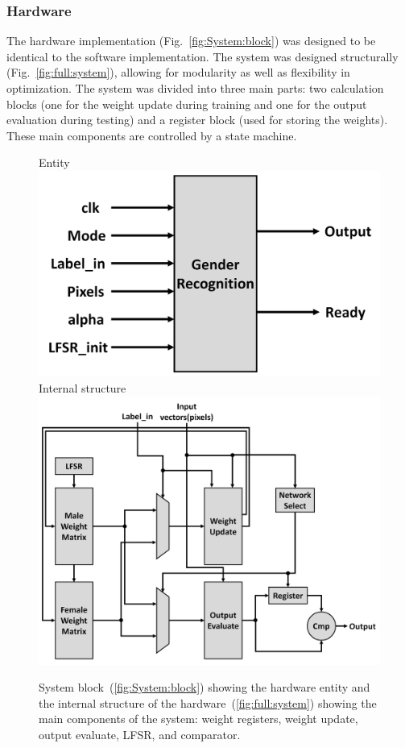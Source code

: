 \documentclass[10pt,journal]{IEEEtran}
\newcommand{\fig}[1]{Fig.~\ref{#1}}
\newcommand{\subfig}[1]{~(\ref{#1})}
\begin{document}
		\subsubsection{Hardware}
			The hardware implementation (\fig{fig:System:block}) was designed to be identical to the software implementation. The system was designed structurally (\fig{fig:full:system}), allowing for modularity as well as flexibility in optimization. The system was divided into three main parts: two calculation blocks (one for the weight update during training and one for the output evaluation during testing) and a register block (used for storing the weights). These main components are controlled by a state machine.
			
			\begin{figure}[t]
				\captionsetup[subfigure]{position=b}
				\centering
				\hfill
				\subcaptionbox
				{
					Entity
					\label{fig:System:block}
				}
				{\includegraphics[width=0.9\columnwidth]{System_block}}
				\hfill
				\subcaptionbox
				{
					Internal structure
					\label{fig:full:system}
				}
				{\includegraphics[width=0.9\columnwidth]{Full_system}}
				\hfill
				\caption{System block\subfig{fig:System:block} showing the hardware entity and the internal structure of the hardware\subfig{fig:full:system} showing the main components of the system: weight registers, weight update, output evaluate, LFSR, and comparator.}
				\label{fig:hardware:system}
			\end{figure}
			
\end{document}
